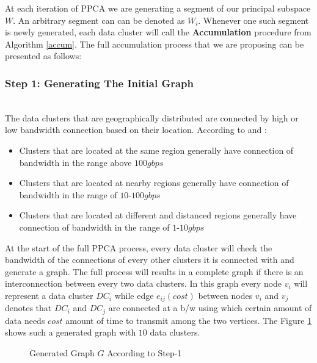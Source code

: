 \documentclass[10pt,conference,letterpaper]{IEEEtran}
\begin{document}
At each iteration of PPCA we are generating a segment of our principal subspace $W$. An arbitrary segment can can be denoted as $W_i$. Whenever one such segment is newly generated, each data cluster will call the \textbf{Accumulation} procedure from Algorithm \ref{accum}. The full accumulation process that we are proposing can be presented as follows:

\subsubsection{\textbf{Step 1: Generating The Initial Graph}}\hspace*{\fill} \\
The data clusters that are geographically distributed are connected by high or low bandwidth connection based on their location. According to \cite{nokia} and \cite{fujitsu}:
\begin{itemize}
\item Clusters that are located at the same region  generally have connection of bandwidth in the range above $100gbps$ 
\item Clusters that are located at nearby regions  generally have connection of bandwidth in the range of $10$-$100gbps$ 
\item Clusters that are located at different and distanced regions  generally have connection of bandwidth in the range of $1$-$10gbps$ 
\end{itemize}
At the start of the full PPCA process, every data cluster will check the bandwidth of the  connections of every other clusters it is connected with and generate a graph. The full process will results in a complete graph if there is an interconnection between every two data clusters. In this graph every node $v_i$ will represent a data cluster $DC_i$ while edge $e_{ij}(cost)$ between nodes  $v_i$ and  $v_j$ denotes that   $DC_i$ and $DC_j$ are connected at a b/w using which certain amount of data needs $cost$ amount of time to transmit among the two vertices. The Figure \ref{G} shows such a generated graph with $10$ data clusters.


\begin{figure}[!htbp]
\label{G}
\centering
{}
\caption{Generated Graph $G$ According to Step-1}
\end{figure}
\end{document}
